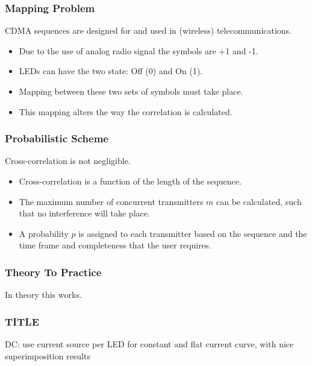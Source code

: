 \documentclass{beamer}
\begin{document}
	\begin{frame}\frametitle{Mapping Problem}
		CDMA sequences are designed for and used in (wireless) telecommunications.

		\begin{itemize}

			\item Due to the use of analog radio signal the symbols are +1 and -1.

			\item LEDs can have the two state: Off (0) and On (1).

			\item Mapping between these two sets of symbols must take place.

			\item This mapping alters the way the correlation is calculated.

		\end{itemize}
		
	\end{frame}


	\begin{frame}\frametitle{Probabilistic Scheme}
		Cross-correlation is not negligible.

		\begin{itemize}

			\item Cross-correlation is a function of the length of the sequence.

			\item The maximum number of concurrent transmitters $m$ can be calculated, such that no interference will take place. %

			\item A probability $p$ is assigned to each transmitter based on the sequence and the time frame and completeness that the user requires.

		\end{itemize}
	\end{frame}


	\begin{frame}\frametitle{Theory To Practice}
		In theory this works.

		
	\end{frame}





	\begin{frame}\frametitle{TITLE}
		DC: use current source per LED for constant and flat current curve, with nice superimposition results
	\end{frame}
\end{document}
